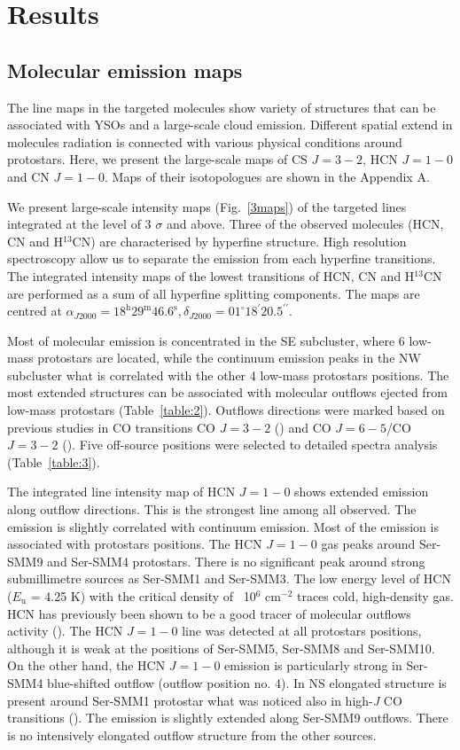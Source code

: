 \documentclass{aa}
\begin{document}
\section{Results}
\subsection{Molecular emission maps}

The line maps in the targeted molecules show variety of structures that can be associated with YSOs and a large-scale cloud emission. Different spatial extend in molecules radiation is connected with various physical conditions around protostars. Here, we present the large-scale maps of CS $J=3-2$, HCN $J=1-0$ and CN $J=1-0$. Maps of their isotopologues are shown in the Appendix A. 

We present large-scale intensity maps (Fig.~\ref{3maps}) of the targeted lines integrated at the level of 3 $\sigma$ and above. Three of the observed molecules (HCN, CN and H$^{13}$CN) are characterised by hyperfine structure. High resolution spectroscopy allow us to separate the emission from each hyperfine transitions. The integrated intensity maps of the lowest transitions of HCN, CN and H$^{13}$CN are performed as a sum of all hyperfine splitting components. The maps are centred at $\alpha_{J2000} = 18^{\mathrm{h}} 29^{\mathrm{m}} 46.6^{\mathrm{s}}, \delta_{J2000} = 01^{\circ} 18^{\prime} 20.5 ^{\prime\prime}$.

Most of molecular emission is concentrated in the SE subcluster, where 6 low-mass protostars are located, while the continuum emission peaks in the NW subcluster  what is correlated with the other 4 low-mass protostars positions. The most extended structures can be associated with molecular outflows ejected from low-mass protostars (Table~\ref{table:2}). Outflows directions were marked based on previous studies in CO transitions CO $J=3-2$ (\citealt{Dio10}) and CO $J=6-5$/CO $J=3-2$ (\citealt{Yil15}). Five off-source positions were selected to detailed spectra analysis (Table~\ref{table:3}).  

The integrated line intensity map of HCN $J=1-0$ shows extended emission along outflow directions. This is the strongest line among all observed. The emission is slightly correlated with continuum emission. Most of the emission is associated with protostars positions. The HCN $J=1-0$ gas peaks around Ser-SMM9 and Ser-SMM4 protostars. There is no significant peak around strong submillimetre sources as Ser-SMM1 and Ser-SMM3. The low energy level of HCN ($E_\mathrm{u}$ = 4.25 K) with the critical density of ~10$^6$ cm$^{-2}$ traces cold, high-density gas. HCN has previously been shown to be a good tracer of molecular outflows activity (\citealt{Lee14}). The HCN $J=1-0$ line was detected at all protostars positions, although it is weak at the positions of Ser-SMM5, Ser-SMM8 and Ser-SMM10. On the other hand, the HCN $J=1-0$ emission is particularly strong in Ser-SMM4 blue-shifted outflow (outflow position no. 4). In NS elongated structure is present around Ser-SMM1 protostar what was noticed also in high-\textit{J} CO transitions (\citealt{Yil15}). The emission is slightly extended along Ser-SMM9 outflows. There is no intensively elongated outflow structure from the other sources.
\end{document}
